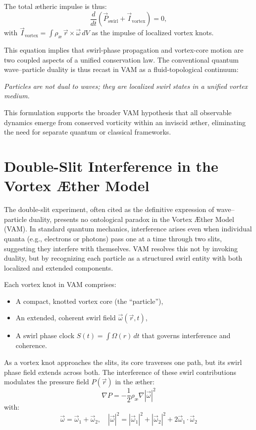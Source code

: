 \documentclass[preprint]{revtex4-2}
\begin{document}
The total ætheric impulse is thus:
\begin{equation}
    \frac{d}{dt} \left( \vec{P}_\text{swirl} + \vec{I}_\text{vortex} \right) = 0,
\end{equation}
with \( \vec{I}_\text{vortex} = \int \rho_\text{\ae} \, \vec{r} \times \vec{\omega} \, dV \) as the impulse of localized vortex knots.

This equation implies that swirl-phase propagation and vortex-core motion are two coupled aspects of a unified conservation law. The conventional quantum wave–particle duality is thus recast in VAM as a fluid-topological continuum:
\begin{center}
    \emph{Particles are not dual to waves; they are localized swirl states in a unified vortex medium.}
\end{center}
This formulation supports the broader VAM hypothesis that all observable dynamics emerge from conserved vorticity within an inviscid æther, eliminating the need for separate quantum or classical frameworks.



\section{Double-Slit Interference in the Vortex Æther Model}

The double-slit experiment, often cited as the definitive expression of wave–particle duality, presents no ontological paradox in the Vortex Æther Model (VAM). In standard quantum mechanics, interference arises even when individual quanta (e.g., electrons or photons) pass one at a time through two slits, suggesting they interfere with themselves. VAM resolves this not by invoking duality, but by recognizing each particle as a structured swirl entity with both localized and extended components.

Each vortex knot in VAM comprises:
\begin{itemize}[leftmargin=1.5em]
    \item A compact, knotted vortex core (the ``particle''),
    \item An extended, coherent swirl field \( \vec{\omega}(\vec{r}, t) \),
    \item A swirl phase clock \( S(t) = \int \Omega(r) \, dt \) that governs interference and coherence.
\end{itemize}

As a vortex knot approaches the slits, its core traverses one path, but its swirl phase field extends across both. The interference of these swirl contributions modulates the pressure field \( P(\vec{r}) \) in the æther:
\[
    \nabla P = -\frac{1}{2} \rho_\text{\ae} \nabla |\vec{\omega}|^2
\]
with:
\[
    \vec{\omega} = \vec{\omega}_1 + \vec{\omega}_2, \quad
    |\vec{\omega}|^2 = |\vec{\omega}_1|^2 + |\vec{\omega}_2|^2 + 2 \vec{\omega}_1 \cdot \vec{\omega}_2
\]
\end{document}
